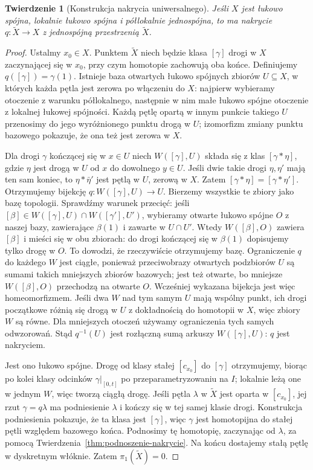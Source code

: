 \documentclass[11pt,a4paper,oneside]{report}
\theoremstyle{plain}
\newtheorem{twierdzenie}{Twierdzenie}[section]
\theoremstyle{definition}
\theoremstyle{remark}
\begin{document}
\begin{twierdzenie}[Konstrukcja nakrycia uniwersalnego]
\label{thm:uniwersalne-nakrycie}
Jeśli $X$ jest łukowo spójna, lokalnie
łukowo spójna i półlokalnie jednospójna,
to ma nakrycie $q:\widetilde X\to X$
z jednospójną przestrzenią $\widetilde X$.
\end{twierdzenie}
\begin{proof}
Ustalmy $x_0\in X$. Punktem $\widetilde X$
niech będzie klasa $[\gamma]$ drogi w $X$
zaczynającej się w $x_0$, przy czym
homotopie zachowują oba końce.
Definiujemy $q([\gamma])=\gamma(1)$.
Istnieje baza otwartych łukowo spójnych
zbiorów $U\subseteq X$, w których
każda pętla jest zerowa po włączeniu do $X$:
najpierw wybieramy otoczenie z warunku
półlokalnego, następnie w nim małe
łukowo spójne otoczenie z lokalnej
łukowej spójności. Każdą pętlę opartą w innym punkcie
takiego $U$ przenosimy do jego wyróżnionego punktu drogą w $U$;
izomorfizm zmiany punktu bazowego pokazuje, że ona też jest zerowa w $X$.

Dla drogi $\gamma$ kończącej się w $x\in U$
niech $W([\gamma],U)$ składa się z klas
$[\gamma*\eta]$, gdzie $\eta$ jest drogą
w $U$ od $x$ do dowolnego $y\in U$.
Jeśli dwie takie drogi $\eta,\eta'$
mają ten sam koniec, to
$\eta*\bar\eta'$ jest pętlą w $U$,
zerową w $X$. Zatem $[\gamma*\eta]
=[\gamma*\eta']$. Otrzymujemy bijekcję
$q:W([\gamma],U)\to U$. Bierzemy wszystkie
te zbiory jako bazę topologii. Sprawdźmy warunek przecięć:
jeśli $[\beta]\in W([\gamma],U)\cap W([\gamma'],U')$,
wybieramy otwarte łukowo spójne $O$ z naszej bazy,
zawierające $\beta(1)$ i zawarte w $U\cap U'$.
Wtedy $W([\beta],O)$ zawiera $[\beta]$ i mieści się w obu zbiorach:
do drogi kończącej się w $\beta(1)$ dopisujemy tylko drogę w $O$.
To dowodzi, że rzeczywiście otrzymujemy bazę.
Ograniczenie $q$ do każdego $W$ jest ciągłe, ponieważ przeciwobrazy
otwartych podzbiorów $U$ są sumami takich mniejszych zbiorów bazowych;
jest też otwarte, bo mniejsze $W([\beta],O)$ przechodzą na otwarte $O$.
Wcześniej wykazana bijekcja jest więc homeomorfizmem.
Jeśli dwa $W$ nad tym samym
$U$ mają wspólny punkt, ich drogi początkowe
różnią się drogą w $U$ z dokładnością
do homotopii w $X$, więc zbiory $W$
są równe. Dla mniejszych otoczeń
używamy ograniczenia tych samych odwzorowań.
Stąd $q^{-1}(U)$ jest rozłączną sumą
arkuszy $W([\gamma],U)$: $q$ jest nakryciem.

Jest ono łukowo spójne. Drogę od klasy
stałej $[c_{x_0}]$ do $[\gamma]$
otrzymujemy, biorąc po kolei klasy
odcinków $\gamma|_{[0,t]}$ po
przeparametryzowaniu na $I$; lokalnie
leżą one w jednym $W$, więc tworzą
ciągłą drogę. Jeśli pętla
$\lambda$ w $\widetilde X$ jest oparta
w $[c_{x_0}]$, jej rzut $\gamma=q\lambda$
ma podniesienie $\lambda$ i kończy
się w tej samej klasie drogi.
Konstrukcja podniesienia pokazuje,
że ta klasa jest $[\gamma]$, więc
$\gamma$ jest homotopijna do stałej
pętli względem bazowego końca.
Podnosimy tę homotopię, zaczynając
od $\lambda$, za pomocą
Twierdzenia~\ref{thm:podnoszenie-nakrycie}.
Na końcu dostajemy stałą pętlę
w dyskretnym włóknie. Zatem
$\pi_1(\widetilde X)=0$.
\end{proof}
\end{document}
